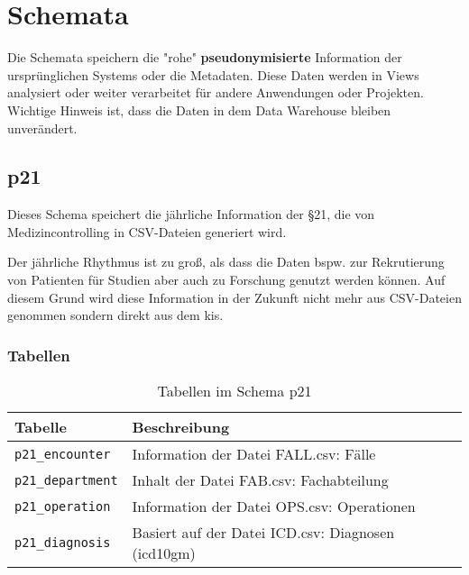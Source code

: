 \chapter{Schemata}
\label{ch: schema}

Die Schemata speichern die "rohe" \textbf{pseudonymisierte} Information der ursprünglichen Systems oder die Metadaten. Diese Daten werden in Views analysiert oder weiter verarbeitet für andere Anwendungen oder Projekten. Wichtige Hinweis ist, dass die Daten in dem Data Warehouse bleiben unverändert.
  \section{p21}
  Dieses Schema speichert die jährliche Information der \S21, die von Medizincontrolling in CSV-Dateien generiert wird. 
  
  Der jährliche Rhythmus ist zu groß, als dass die Daten bspw. zur Rekrutierung von Patienten für Studien aber auch zu Forschung genutzt werden können. Auf diesem Grund wird diese Information in der Zukunft nicht mehr aus CSV-Dateien genommen sondern direkt aus dem \ac{kis}.

  \subsection{Tabellen}
  \begin{table}[ht]
  	\centering   
  	\caption{Tabellen im Schema p21}
  	\begin{tabular}{||l|l||}
  		\hline
  		Tabelle & Beschreibung \\ [0.5ex]
  		\hline\hline
  		\texttt{p21\_encounter} & Information der Datei FALL.csv: Fälle \\
  		\hline
  		\texttt{p21\_department} & Inhalt der Datei  FAB.csv: Fachabteilung \\
  		\hline
  		\texttt{p21\_operation} & Information der Datei  OPS.csv: Operationen \\
  		\hline
  		\texttt{p21\_diagnosis} & Basiert auf der Datei ICD.csv: Diagnosen (\ac{icd10gm}) \\
        \hline
  	\end{tabular}
  \end{table}
  
